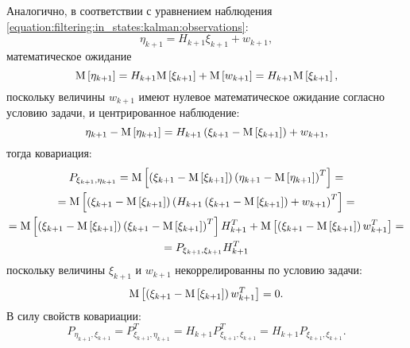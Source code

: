 Аналогично, в соответствии с уравнением наблюдения \eqref{equation:filtering:in_states:kalman:observations}:
$$
	\eta_{k+1} = H_{k+1} \xi_{k+1} + w_{k+1} ,
$$
математическое ожидание
\begin{equation} \label{equation:filtering:in_states:kalman:states_and_observations:observation_expectation}
	\mathrm{M} \left [ \eta_{k+1} \right ]
		= H_{k+1} \mathrm{M} \left [ \xi_{k+1} \right ] + \mathrm{M} \left [ w_{k+1} \right ]
		= H_{k+1} \mathrm{M} \left [ \xi_{k+1} \right ]
	,
\end{equation}
поскольку величины $w_{k+1}$ имеют нулевое математическое ожидание согласно условию задачи, и центрированное наблюдение:
\begin{equation} \label{equation:filtering:in_states:kalman:states_and_observations:centered_observation}
	\eta_{k+1} - \mathrm{M} \left [ \eta_{k+1} \right ] = H_{k+1} \left ( \xi_{k+1} - \mathrm{M} \left [ \xi_{k+1} \right ] \right ) + w_{k+1} ,
\end{equation}
тогда ковариация:
\begin{multline} \label{equation:filtering:in_states:kalman:states_and_observations:state_and_observation_covariance}
	P_{\xi_{k+1}, \eta_{k+1}}
		= \mathrm{M} \left [ \left ( \xi_{k+1} - \mathrm{M} \left [ \xi_{k+1} \right ] \right ) \left ( \eta_{k+1} - \mathrm{M} \left [ \eta_{k+1} \right ] \right )^T \right ] = \\
	= \mathrm{M} \left [ \left ( \xi_{k+1} - \mathrm{M} \left [ \xi_{k+1} \right ] \right ) \left ( H_{k+1} \left ( \xi_{k+1} - \mathrm{M} \left [ \xi_{k+1} \right ] \right ) + w_{k+1} \right )^T \right ] = \\
	= \mathrm{M} \left [ \left ( \xi_{k+1} - \mathrm{M} \left [ \xi_{k+1} \right ] \right ) \left ( \xi_{k+1} - \mathrm{M} \left [ \xi_{k+1} \right ] \right )^T \right ] H_{k+1}^T
		+ \mathrm{M} \left [ \left ( \xi_{k+1} - \mathrm{M} \left [ \xi_{k+1} \right ] \right ) w_{k+1}^T \right ] = \\
	= P_{\xi_{k+1}, \xi_{k+1}} H_{k+1}^T
\end{multline}
поскольку величины $\xi_{k+1}$ и $w_{k+1}$ некоррелированны по условию задачи:
$$
	\mathrm{M} \left [ \left ( \xi_{k+1} - \mathrm{M} \left [ \xi_{k+1} \right ] \right ) w_{k+1}^T \right ] = 0 .
$$
В силу свойств ковариации:
\begin{equation} \label{equation:filtering:in_states:kalman:states_and_observations:observation_and_state_covariance}
	P_{\eta_{k+1}, \xi_{k+1}}
		= P_{\xi_{k+1}, \eta_{k+1}}^T
		= H_{k+1} P_{\xi_{k+1}, \xi_{k+1}}^T
		= H_{k+1} P_{\xi_{k+1}, \xi_{k+1}}
	.
\end{equation}

